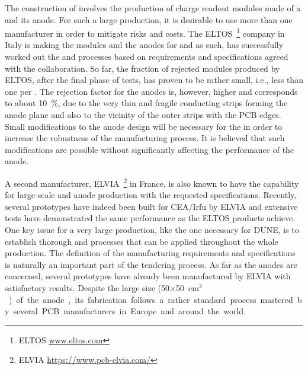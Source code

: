 The construction of %
 involves the production of \dpnumswch charge readout modules made of a  and its anode. For such a large production, it is desirable to use more than one manufacturer in order to mitigate risks and costs. The ELTOS~\footnote{ ELTOS\texttrademark{} \url{www.eltos.com}} company in Italy is making the  modules and the anodes for   and as such, has successfully worked out the  and  processes based on requirements and specifications agreed with the  collaboration. So far, the fraction of rejected  modules produced by ELTOS, after the final phase of tests, has proven to be rather small, i.e., less than one  per . The rejection factor for the anodes is, however, higher and corresponds to about \SI{10}{\%}, due to the very thin and fragile conducting strips forming the anode plane and also to the vicinity of the outer strips with the PCB edges. 
Small modifications to the anode design will be necessary for the  in order to increase the robustness of the manufacturing process. It is believed that such modifications are possible without  %
significantly affecting the performance of the anode.   

A second manufacturer, ELVIA~\footnote{ ELVIA\texttrademark{} \url{https://www.pcb-elvia.com/}} in France, is also known to have the capability for large-scale  and anode production with the requested specifications. Recently, several  prototypes have indeed been built for CEA/Irfu 
by ELVIA and extensive tests have %
demonstrated the same   performance as the ELTOS products achieve.
 One key issue for a very large production, like the one necessary for DUNE, is to establish thorough  and  processes that can be applied throughout the whole  production. The definition of the  manufacturing requirements and specifications is naturally an important part of the tendering process. As far as the anodes are concerned, several prototypes have already been manufactured by ELVIA with satisfactory results. Despite the large size (\num{50}$\times$\SI{50}{cm$^2$}) of the anode, its fabrication follows a rather standard process mastered by several PCB manufacturers in Europe and around the world.     

